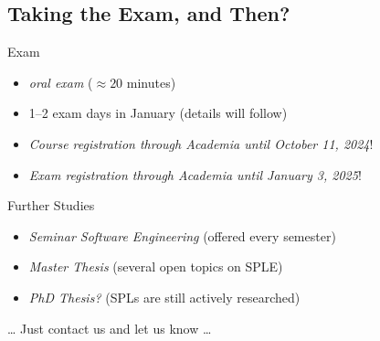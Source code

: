 \subsection{Taking the Exam, and Then?}

\begin{frame}{\myframetitle}
	\begin{mycolumns}
		\begin{definition}{Exam}
			\begin{itemize}
				\item \emph{oral exam} ($\approx 20$ minutes)
				\item 1--2 exam days in January (details will follow)
				\item \emph{Course registration through Academia until October 11, 2024}!
				\item \emph{Exam registration through Academia until January 3, 2025}!
			\end{itemize}
		\end{definition}
	\mynextcolumn
		\begin{example}{Further Studies}
			\begin{itemize}
				\item \emph{Seminar Software Engineering} (offered every semester)
				\item \emph{Master Thesis} (several open topics on SPLE)
				\item \emph{PhD Thesis?} (SPLs are still actively researched)
			\end{itemize}
			\ldots{} Just contact us and let us know \ldots
		\end{example}
	\end{mycolumns}
\end{frame}
